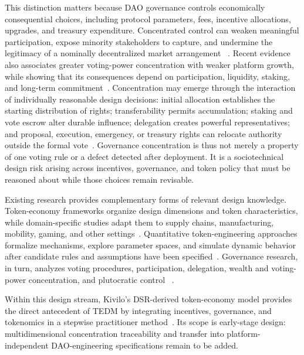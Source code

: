 \documentclass[referee,sn-basic]{sn-jnl}
\begin{document}
This distinction matters because DAO governance controls economically
consequential choices, including protocol parameters, fees, incentive
allocations, upgrades, and treasury expenditure. Concentrated control can
weaken meaningful participation, expose minority stakeholders to capture, and
undermine the legitimacy of a nominally decentralized market arrangement
~\cite{Fritsch2024VotingPower,Wang2025UnderstandingDAOs}.
Recent evidence also associates greater voting-power concentration with weaker
platform growth, while showing that its consequences depend on participation,
liquidity, staking, and long-term commitment~\cite{Han2026DAOGovernance}.
Concentration may emerge through the interaction of individually reasonable
design decisions: initial allocation establishes the starting distribution of
rights; transferability permits accumulation; staking and vote escrow alter
durable influence; delegation creates powerful representatives; and proposal,
execution, emergency, or treasury rights can relocate authority outside the
formal vote~\cite{DelgadoFernandez2024FairLaunch,Han2025Review}. Governance
concentration is thus not merely a property of one
voting rule or a defect detected after deployment. It is a sociotechnical
design risk arising across incentives, governance, and token policy that must
be reasoned about while those choices remain revisable.

Existing research provides complementary forms of relevant design knowledge.
Token-economy frameworks organize design dimensions and token characteristics,
while domain-specific studies adapt them to supply chains, manufacturing,
mobility, gaming, and other settings~\cite{Barrera2020,Benedetti2023,
Khamisa2021,Lage2022,Wang2020,Hofmann2021,Zhang2019,Direr2022}. Quantitative
token-engineering approaches formalize mechanisms, explore parameter spaces,
and simulate dynamic behavior after candidate rules and assumptions have been
specified~\cite{RiceZargham2019TokenEngineeringIII,
Zargham2018StateSpaceBlockchain,liang2023cadcad,Sadykhov2025DeTEcT}.
Governance research, in turn, analyzes voting procedures, participation,
delegation, wealth and voting-power concentration, and plutocratic control
~\cite{Fritsch2024VotingPower,Han2025Review,Han2026DAOGovernance,
Eisermann2025Concentration}.

Within this design stream, Kivilo's DSR-derived token-economy model provides
the direct antecedent of TEDM by integrating incentives, governance, and
tokenomics in a stepwise practitioner method~\cite{Kivilo2023TokenEconomy}.
Its scope is early-stage design: multidimensional concentration traceability
and transfer into platform-independent DAO-engineering specifications remain
to be added.
\end{document}
